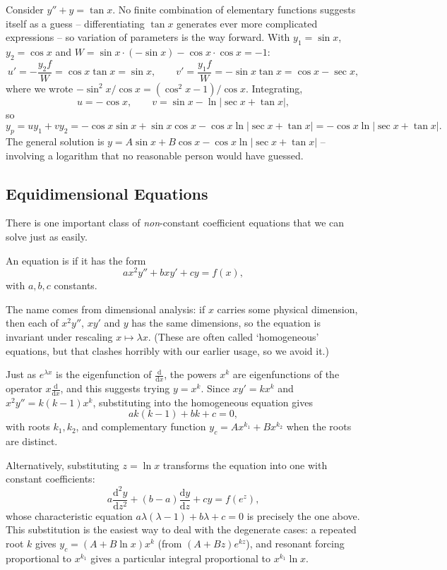 \begin{example}
	Consider $y'' + y = \tan x$. No finite combination of elementary functions suggests itself as a guess -- differentiating $\tan x$ generates ever more complicated expressions -- so variation of parameters is the way forward. With $y_1 = \sin x$, $y_2 = \cos x$ and $W = \sin x \cdot(-\sin x) - \cos x \cdot \cos x = -1$:
	$$
	u' = -\frac{y_2 f}{W} = \cos x \tan x = \sin x, \qquad v' = \frac{y_1 f}{W} = -\sin x \tan x = \cos x - \sec x,
	$$
	where we wrote $-\sin^2 x/\cos x = (\cos^2 x - 1)/\cos x$. Integrating,
	$$
	u = -\cos x, \qquad v = \sin x - \ln|\sec x + \tan x|,
	$$
	so
	$$
	y_p = u y_1 + v y_2 = -\cos x \sin x + \sin x \cos x - \cos x \ln |\sec x + \tan x| = -\cos x \ln|\sec x + \tan x|.
	$$
	The general solution is $y = A \sin x + B \cos x - \cos x \ln |\sec x + \tan x|$ -- involving a logarithm that no reasonable person would have guessed.
\end{example}

\subsection{Equidimensional Equations}

There is one important class of \emph{non}-constant coefficient equations that we can solve just as easily.

\begin{definition}
	An equation is  if it has the form
	$$
	a x^2 y'' + b x y' + c y = f(x),
	$$
	with $a, b, c$ constants.
\end{definition}

The name comes from dimensional analysis: if $x$ carries some physical dimension, then each of $x^2 y''$, $xy'$ and $y$ has the same dimensions, so the equation is invariant under rescaling $x \mapsto \lambda x$. (These are often called `homogeneous' equations, but that clashes horribly with our earlier usage, so we avoid it.)

Just as $e^{\lambda x}$ is the eigenfunction of $\frac{\mathrm{d}}{\mathrm{d}x}$, the powers $x^k$ are eigenfunctions of the operator $x \frac{\mathrm{d}}{\mathrm{d}x}$, and this suggests trying $y = x^k$. Since $xy' = k x^k$ and $x^2 y'' = k(k-1)x^k$, substituting into the homogeneous equation gives
$$
a k (k - 1) + bk + c = 0,
$$
with roots $k_1, k_2$, and complementary function $y_c = A x^{k_1} + B x^{k_2}$ when the roots are distinct.

Alternatively, substituting $z = \ln x$ transforms the equation into one with constant coefficients:
$$
a \frac{\mathrm{d}^2 y}{\mathrm{d}z^2} + (b - a) \frac{\mathrm{d}y}{\mathrm{d}z} + c y = f(e^z),
$$
whose characteristic equation $a\lambda(\lambda - 1) + b\lambda + c = 0$ is precisely the one above. This substitution is the easiest way to deal with the degenerate cases: a repeated root $k$ gives $y_c = (A + B \ln x)x^k$ (from $(A + Bz)e^{kz}$), and resonant forcing proportional to $x^{k_1}$ gives a particular integral proportional to $x^{k_1} \ln x$.

